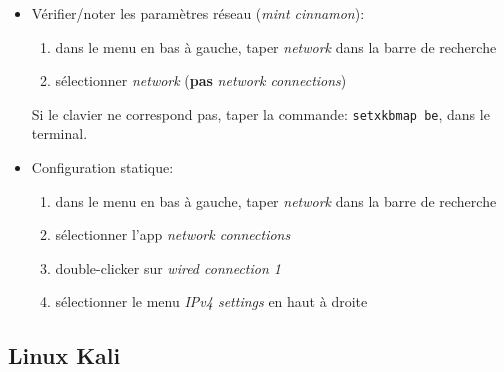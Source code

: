 \documentclass[a4paper]{article}
\renewcommand{\tt}{\texttt}
\begin{document}
\begin{itemize}





\item Vérifier/noter les paramètres réseau (\textit{mint cinnamon}):
\begin{enumerate}
    \item dans le menu en bas à gauche, taper \textit{network} dans la barre de recherche
    \item sélectionner \textit{network} (\textbf{pas} \textit{network connections})
\end{enumerate}
\begin{example}
    Si le clavier ne correspond pas, taper la commande: \tt{setxkbmap be}, dans le terminal.
\end{example}





\item Configuration statique:
\begin{enumerate}
    \item dans le menu en bas à gauche, taper \textit{network} dans la barre de recherche
    \item sélectionner l'app \textit{network connections}
    \item double-clicker sur \textit{wired connection 1}
    \item sélectionner le menu \textit{IPv4 settings} en haut à droite
\end{enumerate}



\end{itemize}










\subsection{Linux Kali} \label{subsec:KaliGUI}
\end{document}
